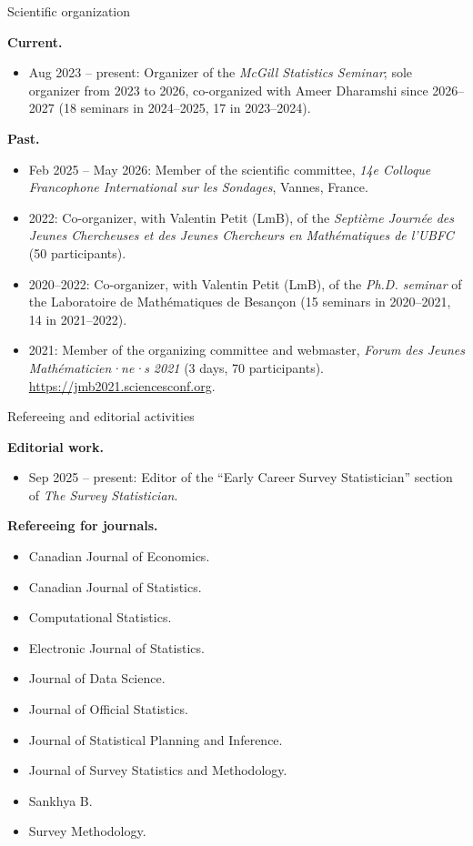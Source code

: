 \documentclass{resume}
\begin{document}
\begin{rSection}{Scientific organization}
\vspace{2mm}

\textbf{Current.}
\begin{itemize}
  \item[--] Aug 2023 -- present: Organizer of the \emph{McGill Statistics Seminar}; sole organizer from 2023 to 2026, co-organized with Ameer Dharamshi since 2026--2027 (18 seminars in 2024--2025, 17 in 2023--2024).
\end{itemize}

\textbf{Past.}
\begin{itemize}
  \item[--] Feb 2025 -- May 2026: Member of the scientific committee, \emph{14e Colloque Francophone International sur les Sondages}, Vannes, France.
  \item[--] 2022: Co-organizer, with Valentin Petit (LmB), of the \emph{Septième Journée des Jeunes Chercheuses et des Jeunes Chercheurs en Mathématiques de l'UBFC} (50 participants).
  \item[--] 2020--2022: Co-organizer, with Valentin Petit (LmB), of the \emph{Ph.D. seminar} of the Laboratoire de Mathématiques de Besançon (15 seminars in 2020--2021, 14 in 2021--2022).
  \item[--] 2021: Member of the organizing committee and webmaster, \emph{Forum des Jeunes Mathématicien·ne·s 2021} (3 days, 70 participants). \url{https://jmb2021.sciencesconf.org}.
\end{itemize}
\end{rSection}

\begin{rSection}{Refereeing and editorial activities}
\vspace{2mm}

\textbf{Editorial work.}
\begin{itemize}
  \item[--] Sep 2025 -- present: Editor of the ``Early Career Survey Statistician'' section of \emph{The Survey Statistician}.
\end{itemize}

\textbf{Refereeing for journals.}
\begin{itemize}
  \item[--] Canadian Journal of Economics.
  \item[--] Canadian Journal of Statistics.
  \item[--] Computational Statistics.
  \item[--] Electronic Journal of Statistics.
  \item[--] Journal of Data Science.
  \item[--] Journal of Official Statistics.
  \item[--] Journal of Statistical Planning and Inference.
  \item[--] Journal of Survey Statistics and Methodology.
  \item[--] Sankhya B.
  \item[--] Survey Methodology.
\end{itemize}
\end{rSection}
\end{document}

